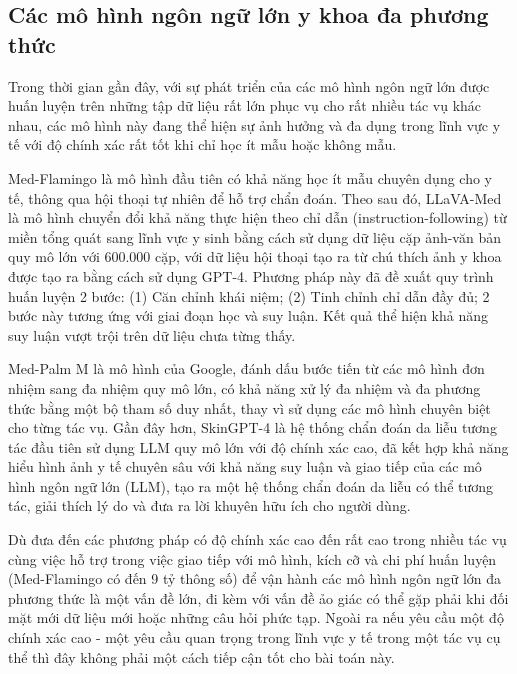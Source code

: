\subsection{Các mô hình ngôn ngữ lớn y khoa đa phương thức} 
Trong thời gian gần đây, với sự phát triển của các mô hình ngôn ngữ lớn được huấn luyện trên những tập dữ liệu rất lớn phục vụ cho rất nhiều tác vụ khác nhau, các mô hình này đang thể hiện sự ảnh hưởng và đa dụng trong lĩnh vực y tế với độ chính xác rất tốt khi chỉ học ít mẫu hoặc không mẫu.

Med-Flamingo \cite{moor_2023_medflamingo} là mô hình đầu tiên có khả năng học ít mẫu chuyên dụng cho y tế, thông qua hội thoại tự nhiên để hỗ trợ chẩn đoán. Theo sau đó, LLaVA-Med \cite{li_2023_llavamed} là mô hình chuyển đổi khả năng thực hiện theo chỉ dẫn (instruction-following) từ miền tổng quát sang lĩnh vực y sinh bằng cách sử dụng dữ liệu cặp ảnh-văn bản quy mô lớn với 600.000 cặp, với dữ liệu hội thoại tạo ra từ chú thích ảnh y khoa được tạo ra bằng cách sử dụng GPT-4. Phương pháp này đã đề xuất quy trình huấn luyện 2 bước: (1) Căn chỉnh khái niệm; (2) Tinh chỉnh chỉ dẫn đầy đủ; 2 bước này tương ứng với giai đoạn học và suy luận. Kết quả thể hiện khả năng suy luận vượt trội trên dữ liệu chưa từng thấy. 

Med-Palm M \cite{MED-PALM-M} là mô hình của Google, đánh dấu bước tiến từ các mô hình đơn nhiệm sang đa nhiệm quy mô lớn, có khả năng xử lý đa nhiệm và đa phương thức bằng một bộ tham số duy nhất, thay vì sử dụng các mô hình chuyên biệt cho từng tác vụ. Gần đây hơn, SkinGPT-4 \cite{SkinGPT-4} là hệ thống chẩn đoán da liễu tương tác đầu tiên sử dụng LLM quy mô lớn với độ chính xác cao, đã kết hợp khả năng hiểu hình ảnh y tế chuyên sâu với khả năng suy luận và giao tiếp của các mô hình ngôn ngữ lớn (LLM), tạo ra một hệ thống chẩn đoán da liễu có thể tương tác, giải thích lý do và đưa ra lời khuyên hữu ích cho người dùng.

Dù đưa đến các phương pháp có độ chính xác cao đến rất cao trong nhiều tác vụ cùng việc hỗ trợ trong việc giao tiếp với mô hình, kích cỡ và chi phí huấn luyện (Med-Flamingo có đến 9 tỷ thông số) để vận hành các mô hình ngôn ngữ lớn đa phương thức là một vấn đề lớn, đi kèm với vấn đề ảo giác có thể gặp phải khi đối mặt mới dữ liệu mới hoặc những câu hỏi phức tạp. Ngoài ra nếu yêu cầu một độ chính xác cao - một yêu cầu quan trọng trong lĩnh vực y tế trong một tác vụ cụ thể thì đây không phải một cách tiếp cận tốt cho bài toán này.

